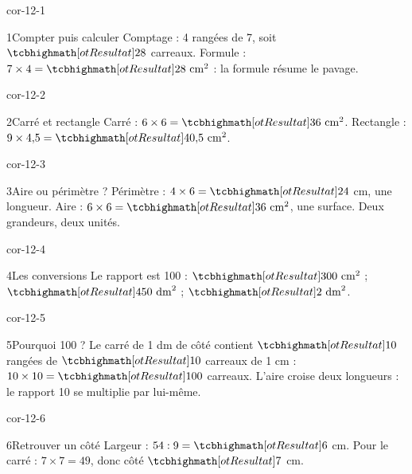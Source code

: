 \clearpage\pagestyle{otMain}\setlength{\otBlocEspacement}{2.5mm}\fontsize{11}{15}\selectfont{}
\begin{blocLivre}{cor-12-1}\begin{corrige}{1}{Compter puis calculer}
Comptage : 4 rangées de 7, soit $\res{28}$ carreaux. Formule : $7\times4=\res{28\ \mathrm{cm}^2}$ : la formule résume le pavage.
\label{fig-cor-12-1}
\end{corrige}\end{blocLivre}
\begin{blocLivre}{cor-12-2}\begin{corrige}{2}{Carré et rectangle}
Carré : $6\times6=\res{36\ \mathrm{cm}^2}$. Rectangle : $9\times4{,}5=\res{40{,}5\ \mathrm{cm}^2}$.
\end{corrige}\end{blocLivre}
\begin{blocLivre}{cor-12-3}\begin{corrige}{3}{Aire ou périmètre ?}
Périmètre : $4\times6=\res{24}$ cm, une longueur. Aire : $6\times6=\res{36}\ \mathrm{cm}^2$, une surface. Deux grandeurs, deux unités.
\end{corrige}\end{blocLivre}
\begin{blocLivre}{cor-12-4}\begin{corrige}{4}{Les conversions}
Le rapport est 100 : $\res{300\ \mathrm{cm}^2}$ ; $\res{450\ \mathrm{dm}^2}$ ; $\res{2\ \mathrm{dm}^2}$.
\end{corrige}\end{blocLivre}
\begin{blocLivre}{cor-12-5}\begin{corrige}{5}{Pourquoi 100 ?}
Le carré de 1 dm de côté contient $\res{10}$ rangées de $\res{10}$ carreaux de 1 cm : $10\times10=\res{100}$ carreaux. L’aire croise deux longueurs : le rapport 10 se multiplie par lui-même.
\label{fig-cor-12-5}
\end{corrige}\end{blocLivre}
\begin{blocLivre}{cor-12-6}\begin{corrige}{6}{Retrouver un côté}
Largeur : $54:9=\res6$ cm. Pour le carré : $7\times7=49$, donc côté $\res7$ cm.
\end{corrige}\end{blocLivre}
